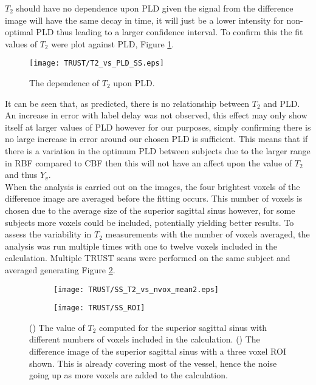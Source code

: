 $T_2$ should have no dependence upon \ac{PLD} given the signal from the difference image will have the same decay in time, it will just be a lower intensity for non-optimal \ac{PLD} thus leading to a larger confidence interval. To confirm this the fit values of $T_2$ were plot against \ac{PLD}, Figure \ref{fig:SS_T2vsPLD}.

\begin{figure}[H]
	\centering
	\texttt{[image: TRUST/T2\_vs\_PLD\_SS.eps]}
	\caption{The dependence of $T_2$ upon \ac{PLD}.}
	\label{fig:SS_T2vsPLD}	
\end{figure}


It can be seen that, as predicted, there is no relationship between $T_2$ and \ac{PLD}. An increase in error with label delay was not observed, this effect may only show itself at larger values of \ac{PLD} however for our purposes, simply confirming there is no large increase in error around our chosen \ac{PLD} is sufficient. This means that if there is a variation in the optimum \ac{PLD} between subjects due to the larger range in \ac{RBF} compared to \ac{CBF} then this will not have an affect upon the value of $T_2$ and thus $Y_v$.\\

When the analysis is carried out on the images, the four brightest voxels of the difference image are averaged before the fitting occurs. This number of voxels is chosen due to the average size of the superior sagittal sinus however, for some subjects more voxels could be included, potentially yielding better results. To assess the variability in $T_2$ measurements with the number of voxels averaged, the analysis was run multiple times with one to twelve voxels included in the calculation. Multiple \ac{TRUST} scans were performed on the same subject and averaged generating Figure \ref{fig:nvox_SS}.\\

\begin{figure}[H]
	\centering
	\begin{subfigure}[c]{0.47\textwidth}
		\centering
		\texttt{[image: TRUST/SS\_T2\_vs\_nvox\_mean2.eps]}
		\caption{}
		\label{fig:nvox_SS}
	\end{subfigure}
	\hfill
	\begin{subfigure}[c]{0.47\textwidth}
		\centering
		\texttt{[image: TRUST/SS\_ROI]}
		\caption{}
		\label{fig:SS_ROI}
	\end{subfigure}
	\caption{() The value of $T_2$ computed for the superior sagittal sinus with different numbers of voxels included in the calculation. () The difference image of the superior sagittal sinus with a three voxel \ac{ROI} shown. This is already covering most of the vessel, hence the noise going up as more voxels are added to the calculation.}
	\label{fig:nv_SS}
\end{figure}

